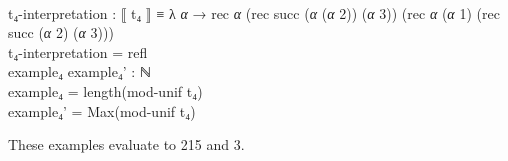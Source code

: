 \documentclass{entcs} \usepackage{prentcsmacro}
\newcommand{\AgdaFontStyle}[1]{\textsf{#1}}
\newcommand{\AgdaBoundFontStyle}[1]{\textit{#1}}
\newcommand{\AgdaNumber}      [1]{\textcolor{AgdaNumber}{#1}}
\newcommand{\AgdaSymbol}      [1]{\textcolor{AgdaSymbol}{#1}}
\newcommand{\AgdaBound}    [1]{\AgdaBoundFontStyle{\textcolor{AgdaBound}{#1}}}
\newcommand{\AgdaInductiveConstructor}[1]
    {\AgdaFontStyle{\textcolor{AgdaInductiveConstructor}{#1}}}
\newcommand{\AgdaDatatype} [1]{\AgdaFontStyle{\textcolor{AgdaDatatype}{#1}}}
\newcommand{\AgdaFunction} [1]{\AgdaFontStyle{\textcolor{AgdaFunction}{#1}}}
\newcommand{\AgdaCodeStyle}{\small}
\newenvironment{code}%
{\noindent\AgdaCodeStyle\pboxed}%
{\endpboxed\par\noindent%
\ignorespacesafterend}
\begin{document}
\begin{code}
\\
\>\AgdaFunction{t₄-interpretation} \AgdaSymbol{:} \AgdaFunction{⟦} \AgdaFunction{t₄} \AgdaFunction{⟧} \AgdaDatatype{≡} \AgdaSymbol{λ} \AgdaBound{α} \AgdaSymbol{→} \AgdaFunction{rec} \AgdaBound{α} \AgdaSymbol{(}\AgdaFunction{rec} \AgdaInductiveConstructor{succ} \AgdaSymbol{(}\AgdaBound{α} \AgdaSymbol{(}\AgdaBound{α} \AgdaNumber{2}\AgdaSymbol{))} \AgdaSymbol{(}\AgdaBound{α} \AgdaNumber{3}\AgdaSymbol{))} \AgdaSymbol{(}\AgdaFunction{rec} \AgdaBound{α} \AgdaSymbol{(}\AgdaBound{α} \AgdaNumber{1}\AgdaSymbol{)} \AgdaSymbol{(}\AgdaFunction{rec} \AgdaInductiveConstructor{succ} \AgdaSymbol{(}\AgdaBound{α} \AgdaNumber{2}\AgdaSymbol{)} \AgdaSymbol{(}\AgdaBound{α} \AgdaNumber{3}\AgdaSymbol{)))}\<%
\\
\>\AgdaFunction{t₄-interpretation} \AgdaSymbol{=} \AgdaInductiveConstructor{refl}\<%
\\
\>\AgdaFunction{example₄} \AgdaFunction{example₄'} \AgdaSymbol{:} \AgdaDatatype{ℕ}\<%
\\
\>\AgdaFunction{example₄} \AgdaSymbol{=} \AgdaFunction{length}\AgdaSymbol{(}\AgdaFunction{mod-unif} \AgdaFunction{t₄}\AgdaSymbol{)}\<%
\\
\>\AgdaFunction{example₄'} \AgdaSymbol{=} \AgdaFunction{Max}\AgdaSymbol{(}\AgdaFunction{mod-unif} \AgdaFunction{t₄}\AgdaSymbol{)}\<%
\\
\>\<\end{code}
These examples evaluate to 215 and 3.
\end{document}

